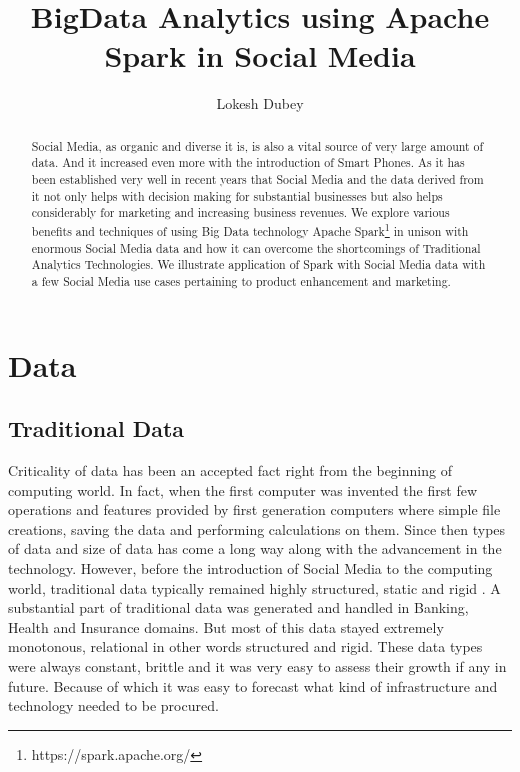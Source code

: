 \documentclass[sigconf]{acmart}
\begin{document}
\title{BigData Analytics using Apache Spark in Social Media}


\author{Lokesh Dubey}

\renewcommand{\shortauthors}{L. Dubey}


\begin{abstract}
Social Media, as organic and diverse it is, is also a vital source of very large amount of data. And it increased even more with the introduction of Smart Phones. As it has been established very well in recent years that Social Media and the data derived from it not only helps with decision making for substantial businesses but also helps considerably for marketing and increasing business revenues. We explore various benefits and techniques of using Big Data technology Apache Spark\footnote{https://spark.apache.org/} in unison with enormous Social Media data and how it can overcome the shortcomings of Traditional Analytics Technologies. We illustrate application of Spark with Social Media data with a few Social Media use cases pertaining to product enhancement and marketing.
\end{abstract}



\maketitle

\section{Data}
\subsection{Traditional Data}

Criticality of data has been an accepted fact right from the beginning of computing world. In fact, when the first computer was invented the first few operations and features provided by first generation computers where simple file creations, saving the data and performing calculations on them. Since then types of data and size of data has come a long way along with the advancement in the technology. However, before the introduction of Social Media to the computing world, traditional data typically remained highly structured, static and rigid \cite{georgevirthadoop}. A substantial part of traditional data was generated and handled in Banking, Health and Insurance domains. But most of this data stayed extremely monotonous, relational in other words structured and rigid. These data types were always constant, brittle and it was very easy to assess their growth if any in future. Because of which it was easy to forecast what kind of infrastructure and technology needed to be procured.
\end{document}
